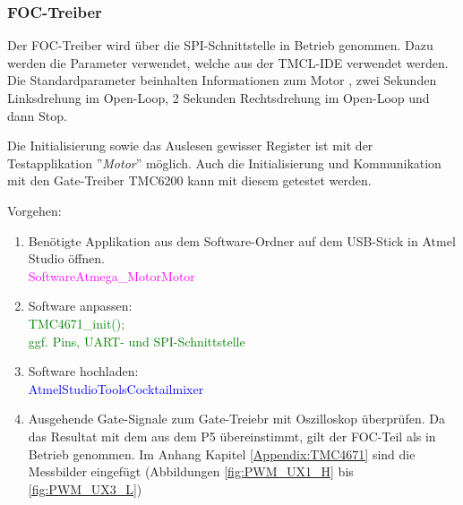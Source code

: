 \subsubsection{FOC-Treiber}
\label{subsubsec:Inbetriebnahme_FOC_Treiber}

Der FOC-Treiber wird über die SPI-Schnittstelle in Betrieb genommen. Dazu werden die Parameter verwendet, welche aus der TMCL-IDE verwendet werden. Die Standardparameter beinhalten Informationen zum Motor , zwei Sekunden Linksdrehung im Open-Loop, 2 Sekunden Rechtsdrehung im Open-Loop und dann Stop.

Die Initialisierung sowie das Auslesen gewisser Register ist mit der Testapplikation ''\textit{Motor}'' möglich. Auch die Initialisierung und Kommunikation mit den Gate-Treiber TMC6200 kann mit diesem getestet werden.

Vorgehen:
\begin{enumerate}
\item Benötigte Applikation aus dem Software-Ordner auf dem USB-Stick in Atmel Studio öffnen.\\
\textcolor{magenta}{Software\textrightarrow Atmega\_Motor\textrightarrow Motor}\\

\item Software anpassen:\\
\textcolor{green}{
TMC4671\_init();\\
ggf. Pins, UART- und SPI-Schnittstelle\\
}
\item Software hochladen:\\
\textcolor{blue}{AtmelStudio\textrightarrow Tools\textrightarrow Cocktailmixer}\\

\item Ausgehende Gate-Signale zum Gate-Treiebr mit Oszilloskop überprüfen. Da das Resultat mit dem aus dem P5 übereinstimmt, gilt der FOC-Teil als in Betrieb genommen. Im Anhang Kapitel \ref{Appendix:TMC4671} sind die Messbilder eingefügt (Abbildungen \ref{fig:PWM_UX1_H} bis \ref{fig:PWM_UX3_L})

\end{enumerate}